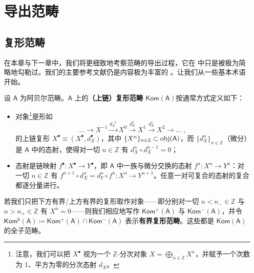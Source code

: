 \section{导出范畴}
\thispagestyle{plain}



\subsection{复形范畴}\label{ch2.1}


在本章与下一章中，我们将更细致地考察范畴的导出过程，它在 \cite[section 3.1]{[Imp21]} 中只是被极为简略地勾勒过。我们的主要参考文献仍是内容极为丰富的 \cite[sections III.1--III.4]{[GM03]}。让我们从一些基本术语开始。

\begin{Def}
	设 $\mathsf{A}$ 为阿贝尔范畴。$\mathsf{A}$ 上的\textbf{（上链）复形范畴 $\mathsf{Kom(A)}$}按通常方式定义如下：
	\begin{itemize}[leftmargin=0.5cm]
		\renewcommand{\labelitemi}{\textendash}
		\item 对象\footnote{注意，我们可以把 $X^\bullet$ 视为一个 $\mathbb{Z}$-分次对象 $X=\bigoplus_{n\in\mathbb{Z}} X^n$，并赋予一个次数为 1、平方为零的分次态射 $d_X$。}是形如
		\[
		...\rightarrow X^{-1}\xrightarrow{d^{-1}_X} X^0\xrightarrow{d^0_X} X^1\xrightarrow{d^1_X}X^2\rightarrow...\;,
		\]
		的上链复形 $X^\bullet\equiv(X^\bullet, d^\bullet_X)$，其中 $\{X^n\}_{n\in\mathbb{Z}}\subset\textup{obj}(\mathsf{A})$，而 $\{d^n_X\}_{n\in\mathbb{Z}}$（微分）是 $\mathsf{A}$ 中的态射，使得对一切 $n\in\mathbb{Z}$ 有 $d^n_X\circ d^{n-1}_X=0$；
		
		\item 态射是链映射 $f^\bullet:X^\bullet\rightarrow Y^\bullet$，即 $\mathsf{A}$ 中一族与微分交换的态射 $f^n:X^n\rightarrow Y^n$：对一切 $n\in\mathbb{Z}$ 有 $f^{n+1}\circ d^n_X = d^n_Y\circ f^n:X^n\rightarrow Y^{n+1}$。任意一对可复合的态射的复合都逐分量进行。
	\end{itemize}
	若我们只把下方有界/上方有界的复形取作对象——即分别对一切 $n<n_-\in\mathbb{Z}$ 与 $n>n_+\in\mathbb{Z}$ 有 $X^n=0$——则我们相应地写作 $\mathsf{Kom^+(A)}$ 与 $\mathsf{Kom^-(A)}$，并令 $\mathsf{Kom^b(A)}\coloneqq\mathsf{Kom^+(A)}\cap\mathsf{Kom^-(A)}$ 表示\textbf{有界复形范畴}。这些都是 $\mathsf{Kom(A)}$ 的全子范畴。
\end{Def}

